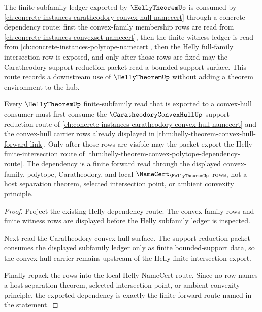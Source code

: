 The finite subfamily ledger exported by $\HellyTheoremUp$ is consumed by \autoref{ch:concrete-instances-caratheodory-convex-hull-namecert} through a concrete dependency route: first the convex-family membership rows are read from \autoref{ch:concrete-instances-convexset-namecert}, then the finite witness ledger is read from \autoref{ch:concrete-instances-polytope-namecert}, then the Helly full-family intersection row is exposed, and only after those rows are fixed may the Caratheodory support-reduction packet read a bounded support surface. This route records a downstream use of $\HellyTheoremUp$ without adding a theorem environment to the hub.

\begin{theorem}
\label{thm:helly-theorem-caratheodory-forward-dependency}
Every $\HellyTheoremUp$ finite-subfamily read that is exported to a convex-hull consumer must first consume the $\CaratheodoryConvexHullUp$ support-reduction route of \autoref{ch:concrete-instances-caratheodory-convex-hull-namecert} and the convex-hull carrier rows already displayed in \autoref{thm:helly-theorem-convex-hull-forward-link}. Only after those rows are visible may the packet export the Helly finite-intersection route of \autoref{thm:helly-theorem-convex-polytope-dependency-route}. The dependency is a finite forward read through the displayed convex-family, polytope, Caratheodory, and local $\NameCert_{\HellyTheoremUp}$ rows, not a host separation theorem, selected intersection point, or ambient convexity principle.
\end{theorem}
\begin{proof}
Project the existing Helly dependency route. The convex-family rows and finite witness rows are displayed before the Helly subfamily ledger is inspected.

Next read the Caratheodory convex-hull surface. The support-reduction packet consumes the displayed subfamily ledger only as finite bounded-support data, so the convex-hull carrier remains upstream of the Helly finite-intersection export.

Finally repack the rows into the local Helly NameCert route. Since no row names a host separation theorem, selected intersection point, or ambient convexity principle, the exported dependency is exactly the finite forward route named in the statement.
\end{proof}


